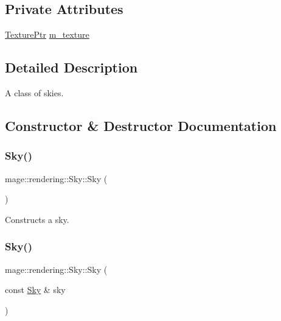 \subsection*{Private Attributes}
\begin{DoxyCompactItemize}
\item 
\hyperlink{namespacemage_1_1rendering_a6f3ae54f825328465b0cdde0f0de4a36}{Texture\+Ptr} \hyperlink{classmage_1_1rendering_1_1_sky_a674493833d7c13a329ba35429a1d9dfa}{m\+\_\+texture}
\end{DoxyCompactItemize}


\subsection{Detailed Description}
A class of skies. 

\subsection{Constructor \& Destructor Documentation}
\hypertarget{classmage_1_1rendering_1_1_sky_a9f6ff8985b45e1a175d5dfdfeda33143}{}\label{classmage_1_1rendering_1_1_sky_a9f6ff8985b45e1a175d5dfdfeda33143} 
\subsubsection{\texorpdfstring{Sky()}{Sky()}\hspace{0.1cm}{\footnotesize\ttfamily [1/3]}}
{\footnotesize\ttfamily mage\+::rendering\+::\+Sky\+::\+Sky (\begin{DoxyParamCaption}{ }\end{DoxyParamCaption})\hspace{0.3cm}{\ttfamily [default]}}

Constructs a sky. \hypertarget{classmage_1_1rendering_1_1_sky_aeafa720fff92be3f02d484a47443b973}{}\label{classmage_1_1rendering_1_1_sky_aeafa720fff92be3f02d484a47443b973} 
\subsubsection{\texorpdfstring{Sky()}{Sky()}\hspace{0.1cm}{\footnotesize\ttfamily [2/3]}}
{\footnotesize\ttfamily mage\+::rendering\+::\+Sky\+::\+Sky (\begin{DoxyParamCaption}\item[{const \hyperlink{classmage_1_1rendering_1_1_sky}{Sky} \&}]{sky }\end{DoxyParamCaption})\hspace{0.3cm}{\ttfamily [default]}}

